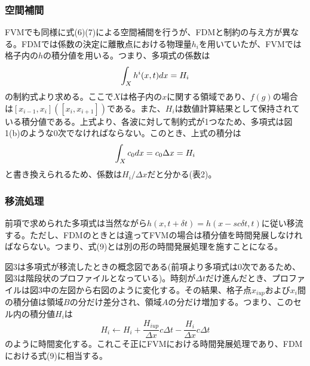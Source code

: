 \documentclass[dvipdfmx, 9pt, a4paper]{jsarticle}
\begin{document}
\subsubsection{空間補間}
FVMでも同様に式(6)(7)による空間補間を行うが、FDMと制約の与え方が異なる。FDMでは係数の決定に離散点における物理量$h_i$を用いていたが、FVMでは格子内の$h$の積分値を用いる。つまり、多項式の係数は
\begin{equation}
\int_X h^i(x, t) dx = H_i \notag
\end{equation}
の制約式より求める。ここで$X$は格子内の$x$に関する領域であり、$f(g)$の場合は$[x_{i-1}, x_i]([x_i, x_{i+1}])$である。また、$H_i$は数値計算結果として保持されている積分値である。上式より、各波に対して制約式が1つなため、多項式は図1(b)のような0次でなければならない。このとき、上式の積分は
\begin{equation}
\int_X c_0dx = c_0\Delta x = H_i \notag
\end{equation}
と書き換えられるため、係数は$H_i/\Delta x$だと分かる(表2)。

\begin{table}[b]
\begin{center}
\caption{FVMにおける係数(表中$H$は列毎に$F$もしくは$G$に置き換える)}
\end{center}
\end{table}

\subsubsection{移流処理}
前項で求められた多項式は当然ながら$h(x, t+\delta t)=h(x-sc\delta t, t)$に従い移流する。ただし、FDMのときとは違ってFVMの場合は積分値を時間発展しなければならない。つまり、式(9)とは別の形の時間発展処理を施すことになる。\par
図3は多項式が移流したときの概念図である(前項より多項式は0次であるため、図3は階段状のプロファイルとなっている)。時刻が$\Delta t$だけ進んだとき、プロファイルは図3中の左図から右図のように変化する。その結果、格子点$x_{iup}$および$x_i$間の積分値は領域$B$の分だけ差分され、領域$A$の分だけ増加する。つまり、このセル内の積分値$H_i$は
\begin{equation}
H_i \leftarrow H_i + \frac{H_{iup}}{\Delta x}c\Delta t - \frac{H_i}{\Delta x}c\Delta t
\end{equation}
のように時間変化する。これこそ正にFVMにおける時間発展処理であり、FDMにおける式(9)に相当する。
\end{document}
